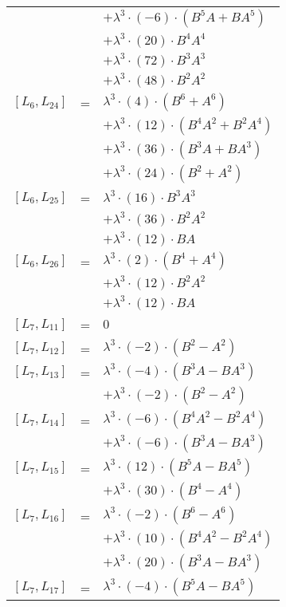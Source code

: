 \documentclass{article}
\begin{document}
\begin{center}
\begin{longtable}{lll}
 & & $ + {\lambda}^3{\cdot}(-6){\cdot}(B^{5}A+BA^{5})$ \\*
 & & $ + {\lambda}^3{\cdot}(20){\cdot}B^{4}A^{4}$ \\*
 & & $ + {\lambda}^3{\cdot}(72){\cdot}B^{3}A^{3}$ \\*
 & & $ + {\lambda}^3{\cdot}(48){\cdot}B^{2}A^{2}$ \\
$[L_{6},L_{24}]$ & = & ${\lambda}^3{\cdot}(4){\cdot}(B^{6}+A^{6})$ \\*
 & & $ + {\lambda}^3{\cdot}(12){\cdot}(B^{4}A^{2}+B^{2}A^{4})$ \\*
 & & $ + {\lambda}^3{\cdot}(36){\cdot}(B^{3}A+BA^{3})$ \\*
 & & $ + {\lambda}^3{\cdot}(24){\cdot}(B^{2}+A^{2})$ \\
$[L_{6},L_{25}]$ & = & ${\lambda}^3{\cdot}(16){\cdot}B^{3}A^{3}$ \\*
 & & $ + {\lambda}^3{\cdot}(36){\cdot}B^{2}A^{2}$ \\*
 & & $ + {\lambda}^3{\cdot}(12){\cdot}BA$ \\
$[L_{6},L_{26}]$ & = & ${\lambda}^3{\cdot}(2){\cdot}(B^{4}+A^{4})$ \\*
 & & $ + {\lambda}^3{\cdot}(12){\cdot}B^{2}A^{2}$ \\*
 & & $ + {\lambda}^3{\cdot}(12){\cdot}BA$ \\
$[L_{7},L_{11}]$ & = & $ 0 $ \\
$[L_{7},L_{12}]$ & = & ${\lambda}^3{\cdot}(-2){\cdot}(B^{2}-A^{2})$ \\
$[L_{7},L_{13}]$ & = & ${\lambda}^3{\cdot}(-4){\cdot}(B^{3}A-BA^{3})$ \\*
 & & $ + {\lambda}^3{\cdot}(-2){\cdot}(B^{2}-A^{2})$ \\
$[L_{7},L_{14}]$ & = & ${\lambda}^3{\cdot}(-6){\cdot}(B^{4}A^{2}-B^{2}A^{4})$ \\*
 & & $ + {\lambda}^3{\cdot}(-6){\cdot}(B^{3}A-BA^{3})$ \\
$[L_{7},L_{15}]$ & = & ${\lambda}^3{\cdot}(12){\cdot}(B^{5}A-BA^{5})$ \\*
 & & $ + {\lambda}^3{\cdot}(30){\cdot}(B^{4}-A^{4})$ \\
$[L_{7},L_{16}]$ & = & ${\lambda}^3{\cdot}(-2){\cdot}(B^{6}-A^{6})$ \\*
 & & $ + {\lambda}^3{\cdot}(10){\cdot}(B^{4}A^{2}-B^{2}A^{4})$ \\*
 & & $ + {\lambda}^3{\cdot}(20){\cdot}(B^{3}A-BA^{3})$ \\
$[L_{7},L_{17}]$ & = & ${\lambda}^3{\cdot}(-4){\cdot}(B^{5}A-BA^{5})$ \\*

\end{longtable}
\end{center}
\end{document}
